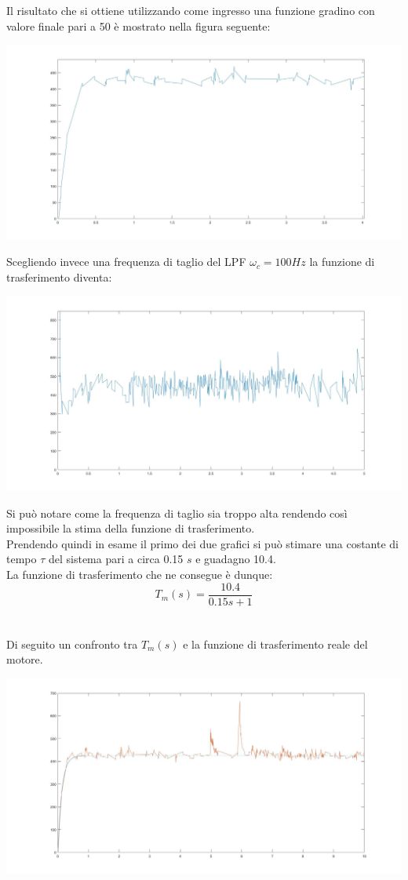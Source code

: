 Il risultato che si ottiene utilizzando come ingresso una funzione gradino con valore finale pari a 50 è mostrato nella figura seguente:
\begin{center}
	\includegraphics[width=\textwidth]{motore50StepCamp1000.jpg}
\end{center}
Scegliendo invece una frequenza di taglio del LPF $\omega_c = 100Hz$ la funzione di trasferimento diventa:
\begin{center}
	\includegraphics[width=\textwidth]{motore50StepCamp1000Polo100.jpg}
\end{center}
Si può notare come la frequenza di taglio sia troppo alta rendendo così impossibile la stima della funzione di trasferimento.\\
Prendendo quindi in esame il primo dei due grafici si può stimare una costante di tempo $\tau$ del sistema pari a circa 0.15 $s$ e guadagno 10.4.\\
La funzione di trasferimento che ne consegue è dunque:
\\
$$
T_m(s)=\displaystyle\frac{10.4}{0.15s+1}
$$
\\\\
Di seguito un confronto tra $T_m(s)$ e la funzione di trasferimento reale del motore.
\begin{center}
	\includegraphics[width=\textwidth]{modMotorvsReale.jpg}
\end{center}
